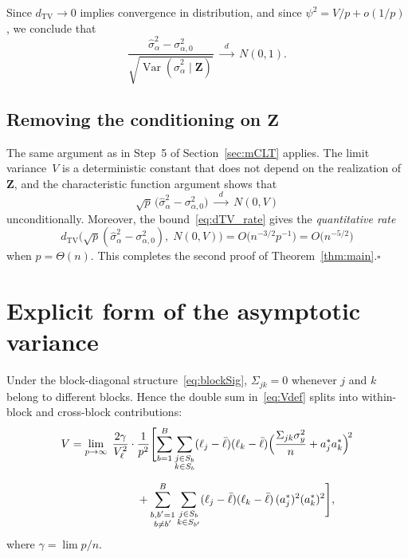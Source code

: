 \documentclass[11pt]{article}
\newcommand{\Var}{\operatorname{Var}}
\newcommand{\dTV}{d_{\mathrm{TV}}}
\newcommand{\Z}{\bm{Z}}
\begin{document}
Since $\dTV\to0$ implies convergence in distribution, and since
$\psi^{2}=V/p+o(1/p)$, we conclude that
\begin{equation}\label{eq:standardised}
  \frac{\hat\sigma_\alpha^{2}-\sigma_{\alpha,0}^{2}}
       {\sqrt{\Var(\hat\sigma_\alpha^{2}\mid\Z)}}
  \;\xrightarrow{\;\;d\;\;}\; N(0,1).
\end{equation}

\subsection{Removing the conditioning on \texorpdfstring{$\Z$}{Z}}

The same argument as in Step~5 of Section~\ref{sec:mCLT} applies.  The
limit variance~$V$ is a deterministic constant that does not depend on the
realization of~$\Z$, and the characteristic function argument shows that
\[
  \sqrt{p}\,\bigl(\hat\sigma_\alpha^{2}-\sigma_{\alpha,0}^{2}\bigr)
  \;\xrightarrow{\;\;d\;\;}\; N(0,V)
\]
unconditionally.  Moreover, the bound~\eqref{eq:dTV_rate} gives the
\emph{quantitative rate}
\begin{equation}\label{eq:rate}
  \dTV\bigl(\sqrt{p}(\hat\sigma_\alpha^{2}-\sigma_{\alpha,0}^{2}),\;
  N(0,V)\bigr)
  = O\bigl(n^{-3/2}p^{-1}\bigr)
  = O\bigl(n^{-5/2}\bigr)
\end{equation}
when $p=\Theta(n)$.  This completes the second proof of
Theorem~\ref{thm:main}.\hfill$\square$

\section{Explicit form of the asymptotic variance}\label{sec:Vexplicit}

Under the block-diagonal structure~\eqref{eq:blockSig}, $\Sigma_{jk}=0$
whenever $j$ and $k$ belong to different blocks.  Hence the double sum
in~\eqref{eq:Vdef} splits into within-block and cross-block contributions:
\begin{align}
  V &= \lim_{p\to\infty}\;\frac{2\gamma}{V_\ell^{2}}\cdot
    \frac{1}{p^{2}}\Biggl[
    \sum_{b=1}^{B}\sum_{\substack{j\in S_b\\k\in S_b}}
      (\ell_j-\bar\ell)(\ell_k-\bar\ell)
      \Bigl(\frac{\Sigma_{jk}\sigma_y^{2}}{n}+a_j^{*}a_k^{*}\Bigr)^{\!2}
    \notag\\[6pt]
    &\qquad\qquad\qquad
    + \sum_{\substack{b,b'=1\\b\ne b'}}^{B}
      \sum_{\substack{j\in S_b\\k\in S_{b'}}}
        (\ell_j-\bar\ell)(\ell_k-\bar\ell)\,(a_j^{*})^{2}(a_k^{*})^{2}
    \Biggr],
  \label{eq:Vexplicit}
\end{align}
where $\gamma=\lim p/n$.
\end{document}
